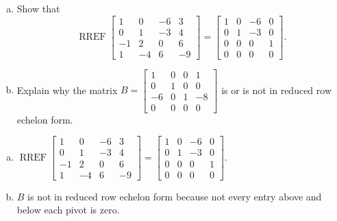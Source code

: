
\begin{exerciseStatement}

\begin{enumerate}[(a)]
\item Show that \[\operatorname{RREF} \left[\begin{array}{cccc}
1 & 0 & -6 & 3 \\
0 & 1 & -3 & 4 \\
-1 & 2 & 0 & 6 \\
1 & -4 & 6 & -9
\end{array}\right] = \left[\begin{array}{cccc}
1 & 0 & -6 & 0 \\
0 & 1 & -3 & 0 \\
0 & 0 & 0 & 1 \\
0 & 0 & 0 & 0
\end{array}\right] .\]
\item Explain why the matrix \(B= \left[\begin{array}{cccc}
1 & 0 & 0 & 1 \\
0 & 1 & 0 & 0 \\
-6 & 0 & 1 & -8 \\
0 & 0 & 0 & 0
\end{array}\right] \) is or is not in reduced row echelon form.
\end{enumerate}
    
\end{exerciseStatement}
    
\begin{exerciseAnswer} 

\begin{enumerate}[(a)]
\item \(\operatorname{RREF} \left[\begin{array}{cccc}
1 & 0 & -6 & 3 \\
0 & 1 & -3 & 4 \\
-1 & 2 & 0 & 6 \\
1 & -4 & 6 & -9
\end{array}\right] = \left[\begin{array}{cccc}
1 & 0 & -6 & 0 \\
0 & 1 & -3 & 0 \\
0 & 0 & 0 & 1 \\
0 & 0 & 0 & 0
\end{array}\right] .\)
\item \(B\) is not in reduced row echelon form because not every entry above and below each pivot is zero. 
\end{enumerate}
    
\end{exerciseAnswer}
    
